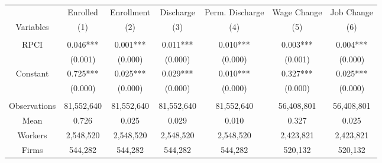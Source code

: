 \begin{tabular}{c|cccccc}
\toprule
\toprule
      & Enrolled & Enrollment & Discharge & Perm. Discharge & Wage Change & Job Change \\
Variables & \multicolumn{1}{p{7.085em}}{(1)} & \multicolumn{1}{p{7.085em}}{(2)} & \multicolumn{1}{p{7.085em}}{(3)} & \multicolumn{1}{p{7.085em}}{(4)} & \multicolumn{1}{p{7.085em}}{(5)} & \multicolumn{1}{p{7.085em}}{(6)} \\
\midrule
      &       &       &       &       &       &  \\
RPCI  & \multicolumn{1}{p{7.085em}}{0.046***} & \multicolumn{1}{p{7.085em}}{0.001***} & \multicolumn{1}{p{7.085em}}{0.011***} & \multicolumn{1}{p{7.085em}}{0.010***} & \multicolumn{1}{p{7.085em}}{0.003***} & \multicolumn{1}{p{7.085em}}{0.004***} \\
      & (0.001) & (0.000) & (0.000) & (0.000) & (0.001) & (0.000) \\
Constant & \multicolumn{1}{p{7.085em}}{0.725***} & \multicolumn{1}{p{7.085em}}{0.025***} & \multicolumn{1}{p{7.085em}}{0.029***} & \multicolumn{1}{p{7.085em}}{0.010***} & \multicolumn{1}{p{7.085em}}{0.327***} & \multicolumn{1}{p{7.085em}}{0.025***} \\
      & (0.000) & (0.000) & (0.000) & (0.000) & (0.000) & (0.000) \\
      &       &       &       &       &       &  \\
\midrule
Observations & 81,552,640 & 81,552,640 & 81,552,640 & 81,552,640 & 56,408,801 & 56,408,801 \\
Mean  & 0.726 & 0.025 & 0.029 & 0.010 & 0.327 & 0.025 \\
Workers & 2,548,520 & 2,548,520 & 2,548,520 & 2,548,520 & 2,423,821 & 2,423,821 \\
Firms & 544,282 & 544,282 & 544,282 & 544,282 & 520,132 & 520,132 \\
\bottomrule
\bottomrule
\end{tabular}%

